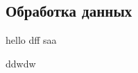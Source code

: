 \documentclass[a4paper,12pt]{article}
\begin{document}
\begin{centering}
\section* {Обработка данных}
\end{centering}
hello dff
saa

ddwdw
\end{document}
